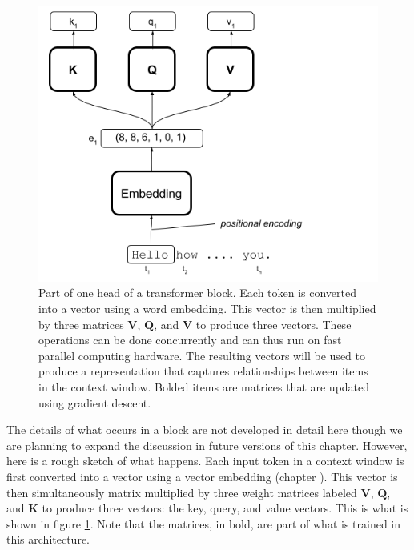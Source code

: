 \begin{figure}[h]
\centering
\includegraphics[scale=.4]{./images/transformerBlockBasic.png}
\caption[Jeff Yoshimi with consultation from Tim Meyer.]{Part of one head of a transformer block. Each token is converted into a vector using a word embedding. This vector is then multiplied by three matrices  $\textbf{V}$, $\textbf{Q}$, and $\textbf{V}$ to produce three vectors. These operations can be done concurrently and can thus run on fast parallel computing hardware. The resulting vectors will be used to produce a representation that captures relationships between items in the context window. Bolded items are matrices that are updated using gradient descent.}
\label{transformerBlockSimple}
\end{figure}

The details of what occurs in a block are not developed in detail here though we are planning to expand the discussion in future versions of this chapter. However, here is a rough sketch of what happens. Each input token in a context window is first converted into a vector using a vector embedding (chapter ). This vector is then simultaneously matrix multiplied by three weight matrices labeled $\textbf{V}$, $\textbf{Q}$, and $\textbf{K}$ to produce three vectors: the key, query, and value vectors. This is what is shown in figure \ref{transformerBlockSimple}.  Note that the matrices, in bold, are part of what is trained in this architecture.

